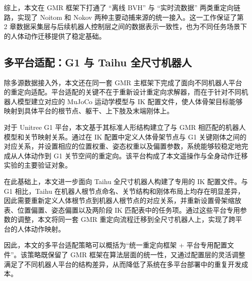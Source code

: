 综上，本文在 GMR 框架下打通了 ``离线 BVH'' 与 ``实时流数据'' 两类重定向链路，实现了 Noitom 和 Nokov 两种主要动捕来源的统一接入。这一工作保证了第 2 章数据采集层与后续机器人控制层之间的数据表示一致性，也为不同任务场景下的人体动作迁移提供了稳定基础。

\subsection{多平台适配：G1 与 Taihu 全尺寸机器人}

除多源数据接入外，本文还在同一套 GMR 主框架下完成了面向不同机器人平台的重定向适配。平台适配的关键不在于重新设计重定向求解器，而在于针对不同机器人模型建立对应的 MuJoCo 运动学模型与 IK 配置文件，使人体骨架目标能够映射到具体平台的根节点、躯干、上下肢及末端刚体上。

对于 Unitree G1 平台，本文基于其标准人形结构建立了与 GMR 相匹配的机器人模型和关节映射关系。通过在 IK 配置中定义人体骨架节点与 G1 关键刚体之间的对应关系，并设置相应的位置权重、姿态权重以及偏置参数，系统能够较稳定地完成从人体动作到 G1 关节空间的重定向。该平台构成了本文遥操作与全身动作迁移实验的主要验证对象。

在此基础上，本文进一步面向 Taihu 全尺寸机器人构建了专用的 IK 配置文件。与 G1 相比，Taihu 在机器人根节点命名、关节结构和刚体布局上均存在明显差异，因此需要重新定义人体根节点到机器人根节点的对应关系，并重新设置骨架缩放表、位置偏置、姿态偏置以及两阶段 IK 匹配表中的任务项。通过这些平台专用参数的调整，本文将同一套 GMR 重定向流程迁移到全尺寸机器人上，实现了跨平台的人体动作映射。

因此，本文的多平台适配策略可以概括为“统一重定向框架 + 平台专用配置文件”。该策略既保留了 GMR 框架在算法层面的统一性，又通过配置层的灵活调整满足了不同机器人平台的结构差异，从而降低了系统在多平台部署中的重复开发成本。
